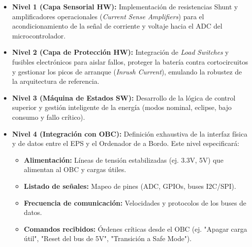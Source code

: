 \begin{itemize}
    \item \textbf{Nivel 1 (Capa Sensorial HW):} Implementación de resistencias Shunt y amplificadores operacionales (\textit{Current Sense Amplifiers}) para el acondicionamiento de la señal de corriente y voltaje hacia el ADC del microcontrolador.
    \item \textbf{Nivel 2 (Capa de Protección HW):} Integración de \textit{Load Switches} y fusibles electrónicos para aislar fallos, proteger la batería contra cortocircuitos y gestionar los picos de arranque (\textit{Inrush Current}), emulando la robustez de la arquitectura de referencia.
    \item \textbf{Nivel 3 (Máquina de Estados SW):} Desarrollo de la lógica de control superior y gestión inteligente de la energía (modos nominal, eclipse, bajo consumo y fallo crítico).
    \item \textbf{Nivel 4 (Integración con OBC):} Definición exhaustiva de la interfaz física y de datos entre el EPS y el Ordenador de a Bordo. Este nivel especificará:
    \begin{itemize}
        \item \textbf{Alimentación:} Líneas de tensión estabilizadas (ej. 3.3V, 5V) que alimentan al OBC y cargas útiles.
        \item \textbf{Listado de señales:} Mapeo de pines (ADC, GPIOs, buses I2C/SPI).
        \item \textbf{Frecuencia de comunicación:} Velocidades y protocolos de los buses de datos.
        \item \textbf{Comandos recibidos:} Órdenes críticas desde el OBC (ej. "Apagar carga útil", "Reset del bus de 5V", "Transición a Safe Mode").
    \end{itemize}
\end{itemize}